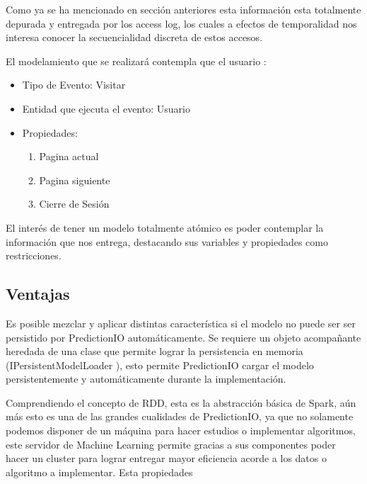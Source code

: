   Como ya se ha mencionado en sección anteriores esta información esta totalmente depurada y entregada por los access log, los cuales a efectos de temporalidad nos interesa conocer la secuencialidad discreta de estos accesos.
  



  El modelamiento que se realizará contempla que el usuario :


    \begin{itemize}
      \item Tipo de Evento: Visitar
      \item Entidad que ejecuta el evento: Usuario
      \item Propiedades:
          \begin{enumerate}
            \item Pagina actual
            \item Pagina siguiente
            \item Cierre de Sesión
          \end{enumerate}
    \end{itemize}



    El interés de tener un modelo totalmente atómico es poder contemplar la información que nos entrega, destacando sus variables y propiedades como restricciones.



\subsection{Ventajas }


  Es posible mezclar y aplicar distintas característica si el modelo no puede ser ser persistido por PredictionIO automáticamente. Se requiere un objeto acompañante heredada de una clase que permite lograr la persistencia en memoria (IPersistentModelLoader ), esto permite PredictionIO  cargar el modelo persistentemente y automáticamente durante la implementación.



  Comprendiendo el concepto de RDD, esta es la abstracción básica de Spark, aún más esto es una de las grandes cualidades de PredictionIO, ya que no solamente podemos disponer de un máquina para hacer estudios o implementar algoritmos, este servidor de Machine Learning permite gracias a sus componentes poder hacer un cluster para lograr entregar mayor eficiencia acorde a los datos o algoritmo a implementar.  Esta propiedades

